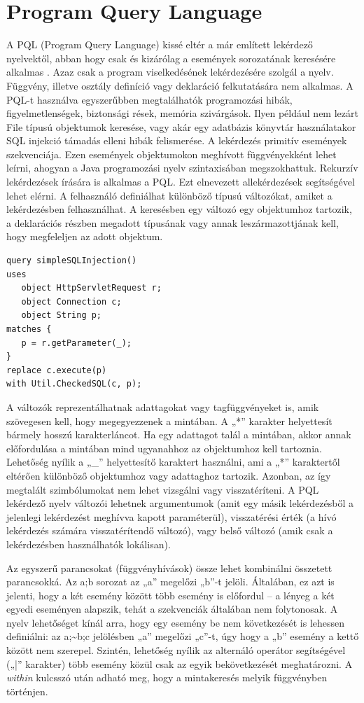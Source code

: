 \documentclass[a4paper,12pt]{report}
\begin{document}
\section{Program Query Language}
\par A PQL (Program Query Language) kissé eltér a már említett lekérdező nyelvektől, abban hogy csak és kizárólag a események sorozatának keresésére alkalmas \cite{pql}. Azaz csak a program viselkedésének lekérdezésére szolgál a nyelv. Függvény, illetve osztály definíció vagy deklaráció felkutatására nem alkalmas. A PQL-t használva egyszerűbben megtalálhatók programozási hibák, figyelmetlenségek, biztonsági rések, memória szivárgások. Ilyen például nem lezárt File típusú objektumok keresése, vagy akár egy adatbázis könyvtár használatakor SQL injekció támadás elleni hibák felismerése. A lekérdezés primitív események szekvenciája. Ezen események objektumokon meghívott függvényekként lehet leírni, ahogyan a Java programozási nyelv szintaxisában megszokhattuk. Rekurzív lekérdezések írására is alkalmas a PQL. Ezt elnevezett allekérdezések segítségével lehet elérni. A felhasználó definiálhat különböző típusú változókat, amiket a lekérdezésben felhasználhat. A keresésben egy változó egy objektumhoz tartozik, a deklarációs részben megadott típusának vagy annak leszármazottjának kell, hogy megfeleljen az adott objektum.
\begin{verbatim}
query simpleSQLInjection()
uses
   object HttpServletRequest r;
   object Connection c;
   object String p;
matches { 
   p = r.getParameter(_); 
}
replace c.execute(p)
with Util.CheckedSQL(c, p);
\end{verbatim} 
\par A változók reprezentálhatnak adattagokat vagy tagfüggvényeket is, amik szövegesen kell, hogy megegyezzenek a mintában. A „*” karakter helyettesít bármely hosszú karakterláncot. Ha egy adattagot talál a mintában, akkor annak előfordulása a mintában mind ugyanahhoz az objektumhoz kell tartoznia. Lehetőség nyílik a „\_” helyettesítő karaktert használni, ami a „*” karaktertől eltérően különböző objektumhoz vagy adattaghoz tartozik. Azonban, az így megtalált szimbólumokat nem lehet vizsgálni vagy visszatéríteni. A PQL lekérdező nyelv változói lehetnek argumentumok (amit egy másik lekérdezésből a jelenlegi lekérdezést meghívva kapott paraméterül), visszatérési érték (a hívó lekérdezés számára visszatérítendő változó), vagy belső változó (amik csak a lekérdezésben használhatók lokálisan).
\par Az egyszerű parancsokat (függvényhívások) össze lehet kombinálni összetett parancsokká. Az a;b sorozat az „a” megelőzi „b”-t jelöli. Általában, ez azt is jelenti, hogy a két esemény között több esemény is előfordul – a lényeg a két egyedi eseményen alapszik, tehát a szekvenciák általában nem folytonosak. A nyelv lehetőséget kínál arra, hogy egy esemény be nem következését is lehessen definiálni: az a;\textasciitilde b;c jelölésben „a” megelőzi „c”-t, úgy hogy a „b” esemény a kettő között nem szerepel. Szintén, lehetőség nyílik az alternáló operátor segítségével („|” karakter) több esemény közül csak az egyik bekövetkezését meghatározni. A \textit{within} kulcsszó után adható meg, hogy a mintakeresés melyik függvényben történjen.
\end{document}
